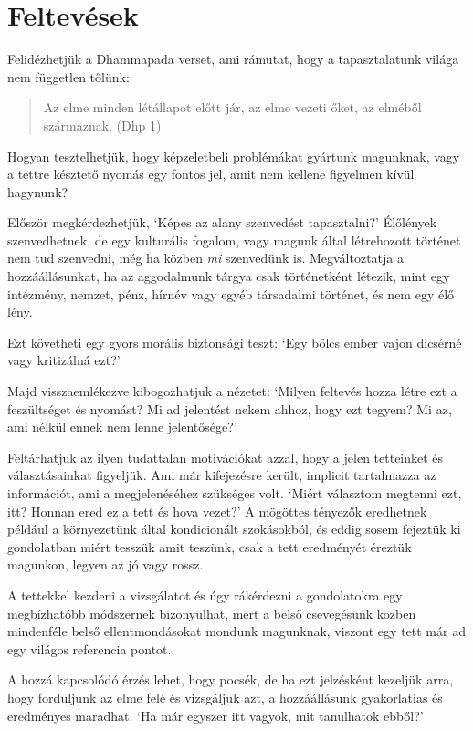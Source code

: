 \section{Feltevések}

Felidézhetjük a Dhammapada verset, ami rámutat, hogy a tapasztalatunk
világa nem független tőlünk:

\begin{quote}
Az elme minden létállapot előtt jár, az elme vezeti őket, az elméből
származnak. (Dhp 1)
\end{quote}

Hogyan tesztelhetjük, hogy képzeletbeli problémákat gyártunk magunknak,
vagy a tettre késztető nyomás egy fontos jel, amit nem kellene figyelmen
kívül hagynunk?

Először megkérdezhetjük, `Képes az alany szenvedést tapasztalni?'
Élőlények szenvedhetnek, de egy kulturális fogalom, vagy magunk által
létrehozott történet nem tud szenvedni, még ha közben \emph{mi}
szenvedünk is. Megváltoztatja a hozzáállásunkat, ha az aggodalmunk
tárgya csak történetként létezik, mint egy intézmény, nemzet, pénz,
hírnév vagy egyéb társadalmi történet, és nem egy élő lény.

Ezt követheti egy gyors morális biztonsági teszt: `Egy bölcs ember vajon
dicsérné vagy kritizálná ezt?'

Majd visszaemlékezve kibogozhatjuk a nézetet: `Milyen feltevés hozza
létre ezt a feszültséget és nyomást? Mi ad jelentést nekem ahhoz, hogy
ezt tegyem? Mi az, ami nélkül ennek nem lenne jelentősége?'

Feltárhatjuk az ilyen tudattalan motivációkat azzal, hogy a jelen
tetteinket és választásainkat figyeljük. Ami már kifejezésre került,
implicit tartalmazza az információt, ami a megjelenéséhez szükséges
volt. `Miért választom megtenni ezt, itt? Honnan ered ez a tett és hova
vezet?' A mögöttes tényezők eredhetnek például a környezetünk által
kondicionált szokásokból, és eddig sosem fejeztük ki gondolatban miért
tesszük amit teszünk, csak a tett eredményét éreztük magunkon, legyen az
jó vagy rossz.

A tettekkel kezdeni a vizsgálatot és úgy rákérdezni a gondolatokra egy
megbízhatóbb módszernek bizonyulhat, mert a belső csevegésünk közben
mindenféle belső ellentmondásokat mondunk magunknak, viszont egy tett
már ad egy világos referencia pontot.

A hozzá kapcsolódó érzés lehet, hogy pocsék, de ha ezt jelzésként
kezeljük arra, hogy forduljunk az elme felé és vizsgáljuk azt, a
hozzáállásunk gyakorlatias és eredményes maradhat. `Ha már egyszer itt
vagyok, mit tanulhatok ebből?'

